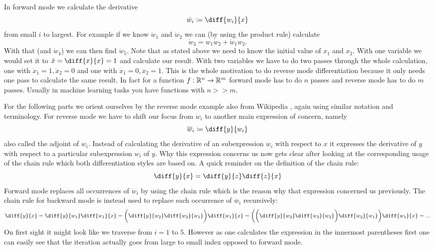 In forward mode we calculate the derivative
\[ \dot w_i \coloneqq \diff{w_i}{x} \]
from small $i$ to largest. For example if we know $\dot w_1$ and $\dot w_2$ we can (by using the product rule) calculate
\[ \dot w_3 = w_1 \dot w_2 + \dot w_1 w_2. \]
With that (and $\dot w_4$) we can then find $\dot w_5$. Note that as stated above we need to know the initial value of $x_1$ and $x_2$. With one variable we would set it to $\dot x = \diff{x}{x} = 1$ and calculate our result. With two variables we have to do two passes through the whole calculation, one with $\dot x_1 = 1, \dot x_2 = 0$ and one with $\dot x_1 = 0, \dot x_2 = 1$. This is the whole motivation to do reverse mode differentiation because it only needs one pass to calculate the same result. In fact for a function $f: \mathbb{R}^n \to \mathbb{R}^m$ forward mode has to do $n$ passes and reverse mode has to do $m$ passes. Usually in machine learning tasks you have functions with $n >\! \!> m$.

\newcommand{\overw}[1]{\overline{w}_{#1}}
\newcommand{\diffyw}[1]{\diff{y}{w_{#1}}}
For the following parts we orient ourselves by the reverse mode example also from Wikipedia \cite{reverseAccumulationWiki}, again using similar notation and terminology. For reverse mode we have to shift our focus from $\dot w_i$ to another main expression of concern, namely
\[ \overw{i} \coloneqq \diffyw{i} \]
also called the adjoint of $w_i$. Instead of calculating the derivative of an subexpression $w_i$ with respect to $x$ it expresses the derivative of $y$ with respect to a particular subexpression $w_i$ of $y$. Why this expression concerns us now gets clear after looking at the corresponding usage of the chain rule which both differentiation styles are based on. A quick reminder on the definition of the chain rule:
\[ \diff{y}{x} = \diff{y}{z}\diff{z}{x} \]
Forward mode replaces all occurrences of $\dot w_i$ by using the chain rule which is the reason why that expression concerned us previously. The chain rule for backward mode is instead used to replace each occurrence of $\overw{i}$ recursively:
\newcommand{\diffw}[2]{\diff{w_{#1}}{w_{#2}}}
\[ \diff{y}{x} = \diffyw{1}\diff{w_1}{x} = \bigg(\diffyw{2}\diffw{2}{1}\bigg)\diff{w_1}{x} = \bigg(\bigg(\diffyw{3}\diffw{3}{2}\bigg)\diffw{2}{1}\bigg)\diff{w_1}{x} = ... \]
On first sight it might look like we traverse from $i = 1$ to $5$. However as one calculates the expression in the innermost parentheses first one can easily see that the iteration actually goes from large to small index opposed to forward mode.


